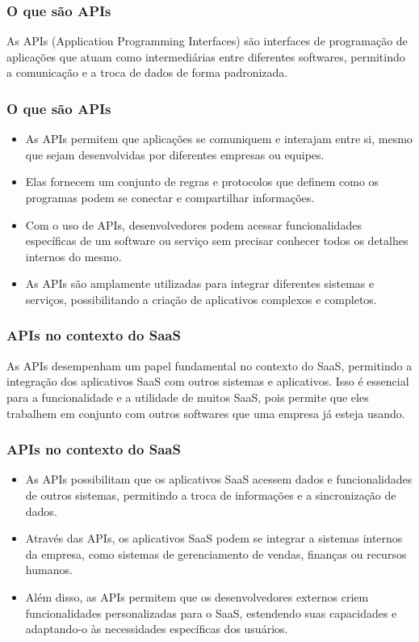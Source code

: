 \documentclass{beamer}
\begin{document}
\begin{frame}
	\frametitle{O que são APIs}

	As APIs (Application Programming Interfaces) são interfaces de programação de aplicações que atuam como intermediárias entre diferentes softwares, permitindo a comunicação e a troca de dados de forma padronizada.


\end{frame}
\begin{frame}
	\frametitle{O que são APIs}


	\begin{itemize}
		\item As APIs permitem que aplicações se comuniquem e interajam entre si, mesmo que sejam desenvolvidas por diferentes empresas ou equipes.
		\item Elas fornecem um conjunto de regras e protocolos que definem como os programas podem se conectar e compartilhar informações.
		\item Com o uso de APIs, desenvolvedores podem acessar funcionalidades específicas de um software ou serviço sem precisar conhecer todos os detalhes internos do mesmo.
		\item As APIs são amplamente utilizadas para integrar diferentes sistemas e serviços, possibilitando a criação de aplicativos complexos e completos.
	\end{itemize}

\end{frame}


\begin{frame}
	\frametitle{APIs no contexto do SaaS}

	As APIs desempenham um papel fundamental no contexto do SaaS, permitindo a integração dos aplicativos SaaS com outros sistemas e aplicativos. Isso é essencial para a funcionalidade e a utilidade de muitos SaaS, pois permite que eles trabalhem em conjunto com outros softwares que uma empresa já esteja usando.


\end{frame}

\begin{frame}
	\frametitle{APIs no contexto do SaaS}

	\begin{itemize}
		\item As APIs possibilitam que os aplicativos SaaS acessem dados e funcionalidades de outros sistemas, permitindo a troca de informações e a sincronização de dados.
		\item Através das APIs, os aplicativos SaaS podem se integrar a sistemas internos da empresa, como sistemas de gerenciamento de vendas, finanças ou recursos humanos.
		\item Além disso, as APIs permitem que os desenvolvedores externos criem funcionalidades personalizadas para o SaaS, estendendo suas capacidades e adaptando-o às necessidades específicas dos usuários.
	\end{itemize}


\end{frame}
\end{document}
